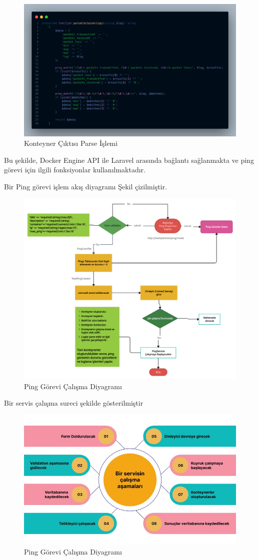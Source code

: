 \begin{figure}[H]
	\centering
	\includegraphics[width=0.8\linewidth]{images/code_parse.png}
	\caption{Konteyner Çıktısı Parse İşlemi}
	\label{fig:container_parse}
\end{figure}

Bu şekilde, Docker Engine API ile Laravel arasında bağlantı sağlanmakta ve ping görevi için ilgili fonksiyonlar kullanılmaktadır.

Bir Ping görevi işlem akış diyagramı Şekil çizilmiştir.
\begin{figure}[H]
	\centering
	\includegraphics[width=1.1\linewidth]{images/ping_task_diagram.png}
	\caption{Ping Görevi Çalışma Diyagramı}
	\label{fig:ping_task_diagram}
\end{figure}


Bir servis çalışma sureci şekilde gösterilmiştir
\begin{figure}[H]
	\centering
	\includegraphics[width=0.6\linewidth]{images/service.jpeg}
	\caption{Ping Görevi Çalışma Diyagramı}
	\label{fig:ping_task_diagram}
\end{figure}

